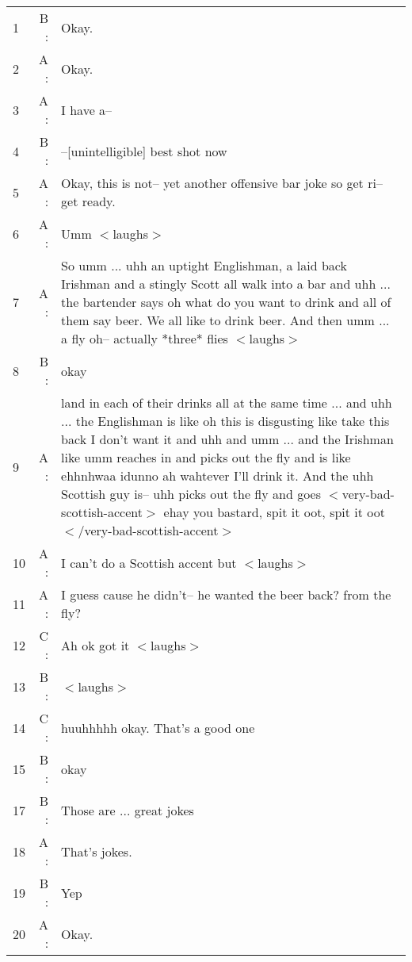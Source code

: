 \documentclass[a4]{scrartcl}
\begin{document}
\begin{center}
\begin{tcolorbox}[title=Joke 4.2A -- Group 1 Zoom]
\begin{tabularx}{0.9\textwidth}{lrX}
  1 &   B : & Okay.\\
  2 &   A : & Okay.\\
  3 &   A : & I have a--\\
  4 &   B : & --[unintelligible] best shot now\\
  5 &   A : & Okay, this is not-- yet another offensive bar joke so get ri-- get ready.\\
  6 &   A : & Umm $<$laughs$>$\\
  7 &   A : & So umm ... uhh an uptight Englishman, a laid back Irishman and a stingly Scott all walk into a bar and uhh ... the bartender says oh what do you want to drink and all of them say beer. We all like to drink beer. And then umm ... a fly oh-- actually *three* flies $<$laughs$>$\\
  8 &   B : & okay\\
  9 &   A : & land in each of their drinks all at the same time ... and uhh ... the Englishman is like oh this is disgusting like take this back I don't want it and uhh and umm ... and the Irishman like umm reaches in and picks out the fly and is like ehhnhwaa idunno ah wahtever I'll drink it. And the uhh Scottish guy is-- uhh picks out the fly and goes $<$very-bad-scottish-accent$>$ ehay you bastard, spit it oot, spit it oot $<$/very-bad-scottish-accent$>$ \\
 10 &   A : & I can't do a Scottish accent but $<$laughs$>$\\
 11 &   A : & I guess cause he didn't-- he wanted the beer back? from the fly?\\
 12 &   C : & Ah ok got it $<$laughs$>$\\
 13 &   B : & $<$laughs$>$\\
 14 &   C : & huuhhhhh okay. That's a good one\\
 15 &   B : & okay\\
 17 &   B : & Those are ... great jokes \\
 18 &   A : & That's jokes.\\
 19 &   B : & Yep\\
 20 &   A : & Okay.\\
\end{tabularx}
\end{tcolorbox}
\end{center}
\end{document}
